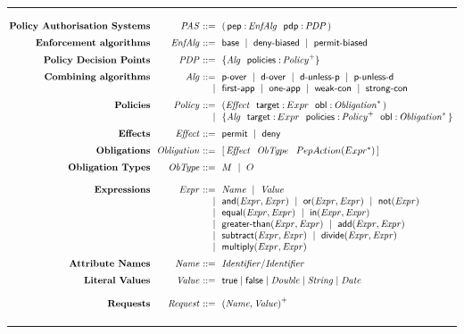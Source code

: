 

\begin{table}[]
\centering
\scriptsize
\caption{Sintassi di FACPL}
\hrule
$
\begin{array}{@{\,}r@{\ \ }r@{\ }r@{\ \ }l@{\ }}
{\textbf{Policy Authorisation Systems}} &
\mathit{PAS} & ::= & ( \,  \x{pep:} \, \mathit{EnfAlg}\ \ \x{pdp:}\, \mathit{PDP} \, )
\\[.2cm]
{\textbf{Enforcement algorithms}} &
\mathit{EnfAlg}
& ::= & \based \Sep \denyBiased \Sep \permitBiased 
\\[.2cm]
{\textbf{Policy Decision Points}} &
\mathit{PDP} & ::= & \pdpPol{\algNT\ }{\x{policies:} \, \mathit{Policy}^{+}}
\\[.2cm]
{\textbf{Combining algorithms}} &
\algNT & ::= & \permitOver \Sep \denyOver \Sep \denyUnless \Sep \permitUnless \\
&& \mid &
\firstApp \Sep \onlyOneApp \Sep \weakCon \Sep \strongCon 
\\[.2cm]
{\textbf{Policies}} &
\mathit{Policy} & ::= &
\ruleOpt{\mathit{Effect}\ \ \x{target:} \, Expr\ \ \x{obl:} \, \mathit{Obligation}^{*} \, } \\
&& \mid &
\{ \algNT\ \ \x{target:} \, Expr\ \ 
\x{policies:} \, \mathit{Policy}^{+} \ \ \x{obl:} \, \mathit{Obligation}^{*} \, \}
\\[.2cm]
{\textbf{Effects}} &
\mathit{Effect} & ::= & \permit \Sep \deny
\\[.2cm]
{\textbf{Obligations}} &
\mathit{Obligation} & ::= & [ \, \mathit{Effect} \ \ \mathit{ObType} \ \ \obl{Expr} \, ]
\\[.2cm]
{\textbf{Obligation Types}} &
\mathit{ObType} & ::= & M \Sep O
\\[.4cm]
\textbf{Expressions}&
\mathit{Expr} & ::= &
\mathit{Name} \Sep \mathit{Value}  \\
& & \mid &\x{and(\mathit{Expr}, \mathit{Expr})} \Sep \x{or(\mathit{Expr}, \mathit{Expr})} \Sep \x{not(\mathit{Expr})} \\
& & \mid &
 \x{equal(\mathit{Expr},\mathit{Expr})}  \Sep \x{in}(\mathit{Expr}, \mathit{Expr}) \\
& & \mid & \x{greater}\textrm{-}\x{than(\mathit{Expr},\mathit{Expr})} \Sep \x{add(\mathit{Expr} ,\mathit{Expr} )}\\ 
& & \mid & \x{subtract(\mathit{Expr} ,\mathit{Expr} )} \Sep \x{divide(\mathit{Expr} ,\mathit{Expr} )}\\
& & \mid & \x{multiply(\mathit{Expr} ,\mathit{Expr} )} \\[.2cm]
%
\textbf{Attribute Names} & 
\mathit{Name} & ::= & \mathit{Identifier}/\mathit{Identifier} \\[.2cm]
%
\textbf{Literal Values} &
\mathit{Value} & ::= & \x{true} \mid \x{false} \mid \mathit{Double} \mid \mathit{String} \mid \mathit{Date}
\\[.4cm]
{\textbf{Requests}} &
\mathit{Request} & ::= & {\attribute{\mathit{Name}}{\mathit{Value}}}^{+}
\\[.1cm]
\end{array}
$
\hrule
\label{tab:facpl_syntax}
\end{table}


